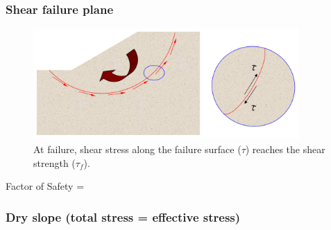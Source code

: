 \documentclass[notes]{beamer}
\begin{document}
\begin{frame}
\frametitle{Shear failure plane}
\begin{figure}[ht]
\centering
\includegraphics[width=0.9\textwidth]{figs/shear-failure-plane.png}
\caption*{At failure, shear stress along the failure surface ($\tau$) reaches the shear strength ($\tau_f$).}
\end{figure}
Factor of Safety = 
\end{frame}

\begin{frame}
\frametitle{Dry slope (total stress = effective stress)}
\end{frame}
\end{document}
